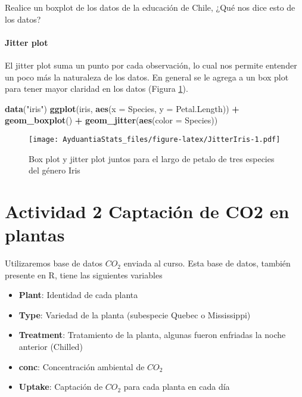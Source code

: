 \documentclass[]{book}
\newenvironment{Shaded}{\begin{snugshade}}{\end{snugshade}}
\newcommand{\DataTypeTok}[1]{\textcolor[rgb]{0.13,0.29,0.53}{#1}}
\newcommand{\KeywordTok}[1]{\textcolor[rgb]{0.13,0.29,0.53}{\textbf{#1}}}
\newcommand{\NormalTok}[1]{#1}
\newcommand{\OperatorTok}[1]{\textcolor[rgb]{0.81,0.36,0.00}{\textbf{#1}}}
\newcommand{\StringTok}[1]{\textcolor[rgb]{0.31,0.60,0.02}{#1}}
\providecommand{\tightlist}{%
  \setlength{\itemsep}{0pt}\setlength{\parskip}{0pt}}
\let\oldparagraph\paragraph
\renewcommand{\paragraph}[1]{\oldparagraph{#1}\mbox{}}
\begin{document}
Realice un boxplot de los datos de la educación de Chile, ¿Qué nos dice esto de los datos?

\hypertarget{jitter-plot}{%
\paragraph{Jitter plot}\label{jitter-plot}}

El jitter plot suma un punto por cada observación, lo cual nos permite entender un poco más la naturaleza de los datos. En general se le agrega a un box plot para tener mayor claridad en los datos (Figura \ref{fig:JitterIris}).

\begin{Shaded}
\begin{Highlighting}[]
\KeywordTok{data}\NormalTok{(}\StringTok{"iris"}\NormalTok{)}
\KeywordTok{ggplot}\NormalTok{(iris, }\KeywordTok{aes}\NormalTok{(}\DataTypeTok{x =}\NormalTok{ Species, }\DataTypeTok{y =}\NormalTok{ Petal.Length)) }\OperatorTok{+}\StringTok{ }\KeywordTok{geom_boxplot}\NormalTok{() }\OperatorTok{+}\StringTok{ }\KeywordTok{geom_jitter}\NormalTok{(}\KeywordTok{aes}\NormalTok{(}\DataTypeTok{color =}\NormalTok{ Species))}
\end{Highlighting}
\end{Shaded}

\begin{figure}
\centering
\texttt{[image: AyduantiaStats\_files/figure-latex/JitterIris-1.pdf]}
\caption{\label{fig:JitterIris}Box plot y jitter plot juntos para el largo de petalo de tres especies del género Iris}
\end{figure}

\hypertarget{actividad-2-captacion-de-co2-en-plantas}{%
\section{Actividad 2 Captación de CO2 en plantas}\label{actividad-2-captacion-de-co2-en-plantas}}

Utilizaremos base de datos \(CO_2\) \citep{potvin1990statistical} enviada al curso. Esta base de datos, también presente en R, tiene las siguientes variables

\begin{itemize}
\tightlist
\item
  \textbf{Plant}: Identidad de cada planta
\item
  \textbf{Type}: Variedad de la planta (subespecie Quebec o Mississippi)
\item
  \textbf{Treatment}: Tratamiento de la planta, algunas fueron enfriadas la noche anterior (Chilled)
\item
  \textbf{conc}: Concentración ambiental de \(CO_2\)
\item
  \textbf{Uptake}: Captación de \(CO_2\) para cada planta en cada día
\end{itemize}
\end{document}
